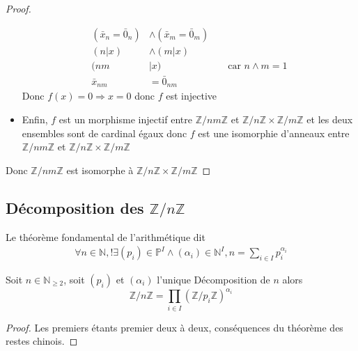\documentclass[11pt,colorlinks]{book}
\theoremstyle{mytheoremstyle}
\theoremstyle{mytheoremstyle}
\theoremstyle{mytheoremstyle}
\theoremstyle{mytheoremstyle}
\theoremstyle{mytheoremstyle}
\theoremstyle{mytheoremstyle}
\theoremstyle{mytheoremstyle}
\theoremstyle{mytheoremstyle}
\theoremstyle{myproblemstyle}
\def\mbb#1{\mathbb{#1}}
\def\bN{\mbb{N}}
\def\bZ{\mbb{Z}}
\begin{document}
\begin{theorem}
\begin{proof}
\begin{itemize}
\begin{align*}
        (\bar{x}_n = \bar{0}_n) &\wedge (\bar{x}_m = \bar{0}_m) \\ 
        (n | x) &\wedge (m | x) \\ 
        (nm &| x) && \text{ car } n \wedge m = 1 \\ 
        \bar{x}_{nm} &= \bar{0}_{nm}
      \end{align*}
      Donc $f(x) = 0 \Rightarrow x=0$ donc $f$ est injective
      \item Enfin, $f$ est un morphisme injectif entre $\bZ/nm\bZ$ et $\bZ/n\bZ \times \bZ/m\bZ$ et les deux ensembles sont de cardinal égaux 
      donc $f$ est une isomorphie d'anneaux entre $\bZ/nm\bZ$ et $\bZ/n\bZ \times \bZ/m\bZ$
    \end{itemize}
    Donc $\bZ/nm\bZ$ est isomorphe à $\bZ/n\bZ \times \bZ/m\bZ$ 
  \end{proof}
\end{theorem}
\subsection{Décomposition des $\bZ/n\bZ$}
\begin{definition}
  Le théorème fondamental de l'arithmétique dit 
  \begin{align*}
    \forall n \in \bN, !\exists (p_i) \in \mathbb{P}^{I} \wedge (\alpha_i) \in \bN^{I}, n = \sum_{i\in I} p_i^{\alpha_i}
  \end{align*}
\end{definition}
\begin{theorem}
  Soit $n \in \bN_{\geq 2}$, soit $(p_i)$ et $(\alpha_i)$ l'unique Décomposition de $n$ alors 
  \begin{equation*}
    \bZ/n\bZ = \prod_{i\in I} (\bZ/p_i\bZ)^{\alpha_i}
  \end{equation*}
  \begin{proof}
    Les premiers étants premier deux à deux, conséquences du théorème des restes chinois.
  \end{proof}
\end{theorem}
\end{document}
